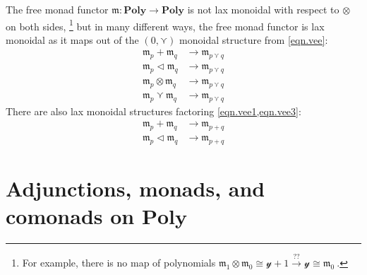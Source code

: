\documentclass[11pt, one side, article]{memoir}
\theoremstyle{definition}
\theoremstyle{plain}
\newcommand{\Cat}[1]{\mathbf{#1}}%
\newcommand{\To}[2][]{\xrightarrow[#1]{#2}}
\newcommand{\yon}{\mathcal{y}}
\newcommand{\poly}{\Cat{Poly}}
\newcommand{\0}{\textsf{0}}
\newcommand{\1}{\tn{\textsf{1}}}
\newcommand{\tri}{\mathbin{\triangleleft}}
\newcommand{\free}{\mathfrak{m}}
\begin{document}
The free monad functor $\free\colon\poly\to\poly$ is not lax monoidal with respect to $\otimes$ on both sides,%
\footnote{For example, there is no map of polynomials 
$
  \free_1\otimes\free_0\cong\yon+1
  \To{??}
  \yon\cong\free_0\
$.
}
but in many different ways, the free monad functor is lax monoidal as it maps out of the $(0,\curlyvee)$ monoidal structure from \eqref{eqn.vee}:
\begin{align}
\label{eqn.vee1}
	\free_p+\free_q&\to\free_{p\curlyvee q}\\
\label{eqn.vee3}
	\free_p\tri\free_q&\to\free_{p\curlyvee q}\\
\label{eqn.vee2}
	\free_p\otimes\free_q&\to\free_{p\curlyvee q}\\
\label{eqn.vee4}
	\free_p\curlyvee\free_q&\to\free_{p\curlyvee q}
\end{align}
There are also lax monoidal structures factoring \cref{eqn.vee1,eqn.vee3}:
\begin{align}
	\free_p+\free_q&\to\free_{p+q}\\
	\free_p\tri\free_q&\to\free_{p+q}
\end{align}


\chapter{Adjunctions, monads, and comonads on $\poly$}\label{chap.adj_mon_com}
\end{document}
